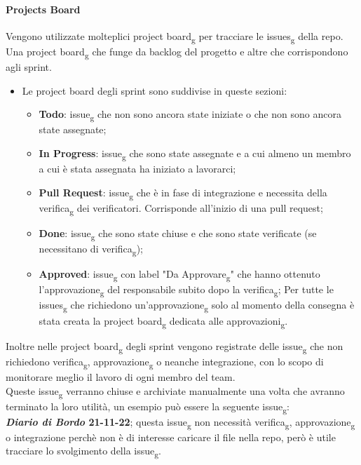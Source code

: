 \paragraph{Projects Board}
Vengono utilizzate molteplici project board\textsubscript{g} per tracciare le issues\textsubscript{g} della repo.
Una project board\textsubscript{g} che funge da backlog del progetto e altre che corrispondono agli sprint.

\begin{itemize}
	\item Le project board degli sprint sono suddivise in queste sezioni:
	\begin{itemize}
		\item \textbf{Todo}: issue\textsubscript{g} che non sono ancora state iniziate o che non sono ancora state assegnate;
		\item \textbf{In Progress}: issue\textsubscript{g} che sono state assegnate e a cui almeno un membro a cui è stata assegnata ha iniziato a lavorarci;
		\item \textbf{Pull Request}: issue\textsubscript{g} che è in fase di integrazione e necessita della verifica\textsubscript{g} dei verificatori. Corrisponde all'inizio di una pull request;
		\item \textbf{Done}: issue\textsubscript{g} che sono state chiuse e che sono state verificate (se necessitano di verifica\textsubscript{g});
		\item \textbf{Approved}: issue\textsubscript{g} con label "Da Approvare\textsubscript{g}" che hanno ottenuto l'approvazione\textsubscript{g} del responsabile subito dopo la verifica\textsubscript{g};
		Per tutte le issues\textsubscript{g} che richiedono un'approvazione\textsubscript{g} solo al momento della consegna è stata creata la project board\textsubscript{g} dedicata alle approvazioni\textsubscript{g}.
		\end{itemize}
	\end{itemize}
	Inoltre nelle project board\textsubscript{g} degli sprint vengono registrate delle issue\textsubscript{g} che non richiedono verifica\textsubscript{g}, approvazione\textsubscript{g} o neanche integrazione, con lo scopo di monitorare meglio il lavoro di ogni membro del team.\\
Queste issue\textsubscript{g} verranno chiuse e archiviate manualmente una volta che avranno terminato la loro utilità, un esempio può essere la seguente issue\textsubscript{g}:\\
\textbf{\textit{Diario di Bordo} 21-11-22}; questa issue\textsubscript{g} non necessità verifica\textsubscript{g}, approvazione\textsubscript{g} o integrazione perchè non è di interesse caricare il file nella repo, però è utile tracciare lo svolgimento della issue\textsubscript{g}.
